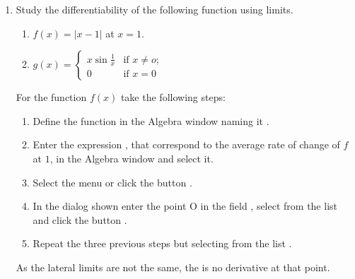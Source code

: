 \begin{enumerate}[leftmargin=*]
% 


\item Study the differentiability of the following function using limits.
\begin{enumerate}
\item $f(x)=|x-1|$  at $x=1$.
\item $g(x)=
\begin{cases}
x\sin\frac{1}{x} & \mbox{if $x\neq o$;}\\
0 & \mbox{if $x=0$}
\end{cases}$
\end{enumerate}

\begin{indication}
For the function $f(x)$ take the following steps:
\begin{enumerate}
\item Define the function in the Algebra window naming it .
\item Enter the expression , that correspond to the average rate of change of $f$ at $1$, in the Algebra window and select it. 
\item Select the menu  or click the button .
\item In the dialog shown enter the point O in the field , select  from the list  and click the button . 
\item Repeat the three previous steps but selecting  from the list .
\end{enumerate}
As the lateral limits are not the same, the is no derivative at that point. 


\end{indication}
\end{enumerate}
